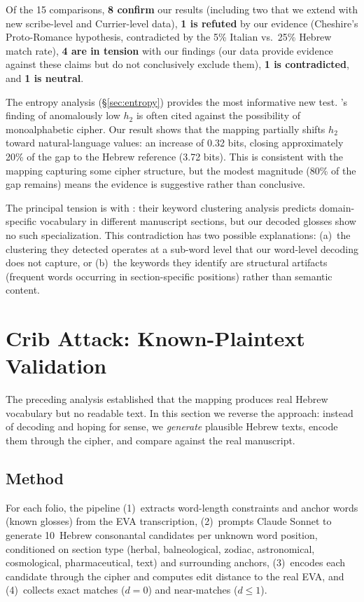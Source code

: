 \documentclass[11pt,a4paper]{article}
\begin{document}
Of the 15 comparisons, \textbf{8 confirm} our results (including two that
we extend with new scribe-level and Currier-level data), \textbf{1 is
refuted} by our evidence (Cheshire's Proto-Romance hypothesis, contradicted
by the 5\% Italian vs.\ 25\% Hebrew match rate), \textbf{4 are in tension}
with our findings (our data provide evidence against these claims but do not
conclusively exclude them), \textbf{1 is contradicted}, and \textbf{1 is
neutral}.

The entropy analysis (\S\ref{sec:entropy}) provides the most informative
new test. \citet{BowernLindemann2021}'s finding of anomalously low $h_2$
is often cited against the possibility of monoalphabetic cipher. Our
result shows that the mapping partially shifts $h_2$ toward
natural-language values: an increase of 0.32 bits, closing approximately
20\% of the gap to the Hebrew reference (3.72 bits). This is consistent
with the mapping capturing some cipher structure, but the modest magnitude
(80\% of the gap remains) means the evidence is suggestive rather than
conclusive.

The principal tension is with \citet{Montemurro2013}: their keyword
clustering analysis predicts domain-specific vocabulary in different
manuscript sections, but our decoded glosses show no such specialization.
This contradiction has two possible explanations: (a)~the clustering they
detected operates at a sub-word level that our word-level decoding does
not capture, or (b)~the keywords they identify are structural artifacts
(frequent words occurring in section-specific positions) rather than
semantic content.


\section{Crib Attack: Known-Plaintext Validation}
\label{sec:crib-attack}

The preceding analysis established that the mapping produces real Hebrew
vocabulary but no readable text. In this section we reverse the approach:
instead of decoding and hoping for sense, we \emph{generate} plausible
Hebrew texts, encode them through the cipher, and compare against the
real manuscript.

\subsection{Method}

For each folio, the pipeline (1)~extracts word-length constraints and
anchor words (known glosses) from the EVA transcription,
(2)~prompts Claude Sonnet to generate 10~Hebrew consonantal candidates
per unknown word position, conditioned on section type (herbal,
balneological, zodiac, astronomical, cosmological, pharmaceutical, text)
and surrounding anchors, (3)~encodes each candidate through the cipher
and computes edit distance to the real EVA, and (4)~collects exact matches
($d=0$) and near-matches ($d\leq 1$).
\end{document}
